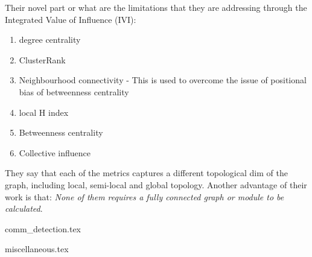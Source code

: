 Their novel part or what are the limitations that they are addressing through the Integrated Value of Influence (IVI):

\begin{enumerate}
    \item degree centrality 
    \item ClusterRank
    \item Neighbourhood connectivity - This is used to overcome the issue of positional bias of betweenness centrality
    \item local H index
    \item Betweenness centrality  
    \item Collective influence 
\end{enumerate}


They say that each of the metrics captures a different topological dim of the graph, including local, semi-local and global topology. Another advantage of their work is that: \textit{None of them requires a fully connected graph or module to be calculated}.


{comm_detection.tex}


{miscellaneous.tex}

\newpage


 


